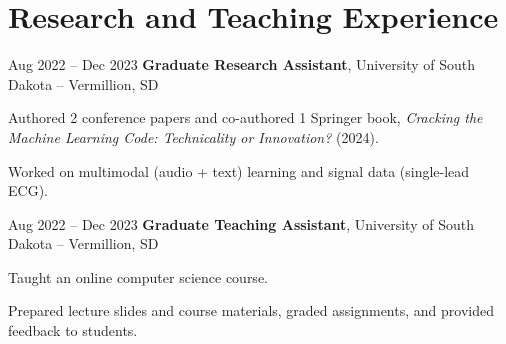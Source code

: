     \section{Research and Teaching Experience}

        \begin{twocolentry}{
            Aug 2022 – Dec 2023
        }
            \textbf{Graduate Research Assistant}, University of South Dakota -- Vermillion, SD\end{twocolentry}
        \vspace{0.06 cm}
        \begin{onecolentry}
            \begin{highlights}
                \item Authored 2 conference papers and co-authored 1 Springer book, \textit{Cracking the Machine Learning Code: Technicality or Innovation?} (2024).
                \item Worked on multimodal (audio + text) learning and signal data (single-lead ECG).
            \end{highlights}
        \end{onecolentry}

        \vspace{0.12 cm}
        \begin{twocolentry}{
            Aug 2022 – Dec 2023
        }
            \textbf{Graduate Teaching Assistant}, University of South Dakota -- Vermillion, SD\end{twocolentry}
        \vspace{0.06 cm}
        \begin{onecolentry}
            \begin{highlights}
                \item Taught an online computer science course.
                \item Prepared lecture slides and course materials, graded assignments, and provided feedback to students.
            \end{highlights}
        \end{onecolentry}

